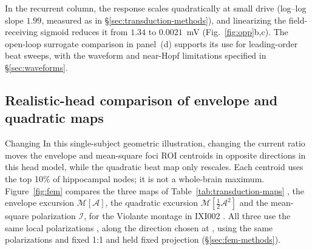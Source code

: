 \documentclass[11pt,a4paper]{article}
\providecommand{\DIFaddtex}[1]{{\protect\color{blue} \sf #1}} %
\providecommand{\DIFdeltex}[1]{{\protect\color{red} \scriptsize #1}} %
\providecommand{\DIFaddbegin}{} %
\providecommand{\DIFaddend}{} %
\providecommand{\DIFdelbegin}{} %
\providecommand{\DIFdelend}{} %
\providecommand{\DIFadd}[1]{\texorpdfstring{\DIFaddtex{#1}}{#1}} %
\providecommand{\DIFdel}[1]{\texorpdfstring{\DIFdeltex{#1}}{}} %
\begin{document}
In the recurrent column, the response scales quadratically at small drive
(log--log slope $1.99$, measured as in \S\ref{sec:transduction-methods}),
and linearizing the field-receiving sigmoid reduces it
from $1.34$ to $0.0021$~mV (Fig.~\ref{fig:opp}b,c). The open-loop surrogate
comparison in panel~(d) supports its use for leading-order beat sweeps, with
the waveform and near-Hopf limitations specified in \S\ref{sec:waveforms}.

\subsection{Realistic-head comparison of envelope and quadratic maps}\label{sec:fem-results}
\DIFdelbegin \DIFdel{Changing }\DIFdelend \DIFaddbegin \DIFadd{In this single-subject geometric illustration, changing }\DIFaddend the current ratio
moves the envelope and mean-square \DIFdelbegin \DIFdel{foci }\DIFdelend \DIFaddbegin \DIFadd{ROI centroids }\DIFaddend in opposite directions\DIFdelbegin \DIFdel{in this head model}\DIFdelend ,
while the quadratic beat map only rescales. \DIFaddbegin \DIFadd{Each centroid uses the top 10\%
of hippocampal nodes; it is not a whole-brain maximum.
}\DIFaddend Figure~\ref{fig:fem} compares the \DIFdelbegin \DIFdel{three }\DIFdelend maps of Table~\ref{tab:transduction-maps}
\DIFdelbegin \DIFdel{, the
envelope excursion $\mathcal M[\mathcal A]$, the quadratic excursion
$\mathcal M[\tfrac12\mathcal A^2]$ and the mean-square polarization $\mathcal I$, }\DIFdelend for the Violante montage in IXI002\DIFdelbegin \DIFdel{. All three use the same local polarizations , along the direction chosen at
}\DIFdelend \DIFaddbegin \DIFadd{, using the same polarizations and fixed
}\DIFaddend 1:1 \DIFdelbegin \DIFdel{and held fixed }\DIFdelend \DIFaddbegin \DIFadd{projection }\DIFaddend (\S\ref{sec:fem-methods}).
\end{document}

